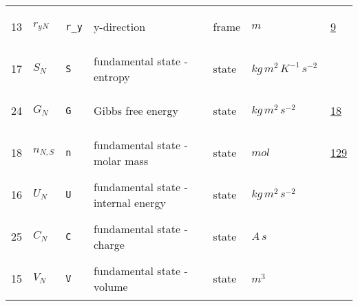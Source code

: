 \begin{longtable}{|p{1cm}|p{2.5cm}|p{4.5cm}|p{8cm}|p{3.0cm}|p{3cm}|p{1cm}|}
                 \\
            13
             & \hypertarget{"v:13"}{ $ {{r_y}}{_{N}} $}
             & \verb|r_y|
             & y-direction
             & \begin{lay}frame \end{lay}
             & $ m  $
             &                 \hyperlink{"e:9"}{ 9 }
                 \\
            17
             & \hypertarget{"v:17"}{ $ {S}{_{N}} $}
             & \verb|S|
             & fundamental state - entropy
             & \begin{lay}state \end{lay}
             & $ kg \,m^{2} \,K^{-1} \,s^{-2} \, $
             & \\
            24
             & \hypertarget{"v:24"}{ $ {G}{_{N}} $}
             & \verb|G|
             & Gibbs free energy
             & \begin{lay}state \end{lay}
             & $ kg \,m^{2} \,s^{-2} \, $
             &                 \hyperlink{"e:18"}{ 18 }
                 \\
            18
             & \hypertarget{"v:18"}{ $ {n}{_{N, S}} $}
             & \verb|n|
             & fundamental state - molar mass
             & \begin{lay}state \end{lay}
             & $ mol \, $
             &                 \hyperlink{"e:129"}{ 129 }
                 \\
            16
             & \hypertarget{"v:16"}{ $ {U}{_{N}} $}
             & \verb|U|
             & fundamental state - internal energy
             & \begin{lay}state \end{lay}
             & $ kg \,m^{2} \,s^{-2} \, $
             & \\
            25
             & \hypertarget{"v:25"}{ $ {C}{_{N}} $}
             & \verb|C|
             & fundamental state - charge
             & \begin{lay}state \end{lay}
             & $ A \,s \, $
             & \\
            15
             & \hypertarget{"v:15"}{ $ {V}{_{N}} $}
             & \verb|V|
             & fundamental state - volume
             & \begin{lay}state \end{lay}
             & $ m^{3} \, $

\end{longtable}
